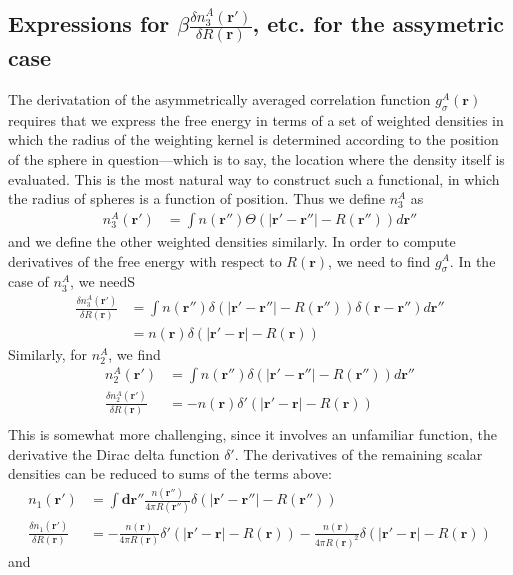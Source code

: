 \documentclass[letterpaper,twocolumn,amsmath,amssymb,jcp,10pt,aip]{revtex4-1}
\newcommand{\rr}{\textbf{r}}
\begin{document}
\begin{widetext}
\subsection{Expressions for $\beta\frac{\delta n_3^{A}(\mathbf{r}')}{\delta R(\mathbf{r})}$, etc. for the assymetric case}\label{appendix:g-A}

The derivatation of the asymmetrically averaged correlation function
$g_\sigma^A(\rr)$ requires that we express the free energy in terms of
a set of weighted densities in which the radius of the weighting
kernel is determined according to the position of the sphere in
question---which is to say, the location where the density itself is
evaluated.  This is the most natural way to construct such a
functional, in which the radius of spheres is a function of position.
Thus we define $n_3^A$ as
\begin{align}
  n_3^{A}(\rr') &= \int n(\rr'') \Theta(\left|\rr' - \rr''\right| -R(\rr'')) d\rr''
\end{align}
and we define the other weighted densities similarly.  In order to
compute derivatives of the free energy with respect to $R(\rr)$, we
need to find $g_\sigma^A$.  In the case of $n_3^A$, we needS
\begin{align}
  \frac{\delta n_3^{A} (\rr')}{\delta R(\rr)} &=
  \int n (\rr'') \delta(|\rr' - \rr''| - R(\rr'')) \delta(\rr-\rr'') d\rr'' \\
   &= n (\rr) \delta(|\rr' - \rr| - R(\rr))
\end{align}
Similarly, for $n_2^A$, we find
\begin{align}
  n_2^{A}(\rr') &= \int n(\rr'') \delta(|\rr' - \rr''| - R(\rr'')) d \rr''\\
  \frac{\delta n_2^{A}(\rr')}{\delta R(\rr)} &= -n(\rr) \delta'(|\rr' - \rr| - R(\rr))\\
\end{align}
This is somewhat more challenging, since it involves an unfamiliar
function, the derivative the Dirac delta function $\delta'$.
%
The derivatives of the remaining scalar densities can be reduced to
sums of the terms above:
\begin{align}
  n_1(\rr') &= \int \mathbf{dr''} \frac{n(\rr'')}{4\pi R(\rr'')}
  \delta(|\rr'-\rr''| - R(\rr'')) \\
  \frac{\delta n_1(\rr')}{\delta R(\rr)}
  &= -\frac{n(\rr)}{4\pi
    R(\rr)}\delta'(|\rr'-\rr| - R(\rr))
  -
  \frac{n(\rr)}{4\pi
    R(\rr)^2}\delta(|\rr'-\rr| - R(\rr))
\end{align}
and
\begin{align}

\end{align}
\end{widetext}
\end{document}
